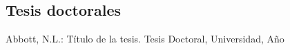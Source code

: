 \subsection{Tesis doctorales}
 Abbott, N.L.: Título de la tesis. Tesis Doctoral, Universidad, Año

